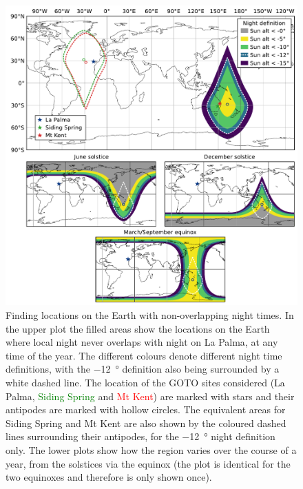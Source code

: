 \begin{colsection}
\begin{figure}[p]
    \begin{center}
        \includegraphics[width=\linewidth]{images/sites.pdf}
    \end{center}
    \caption[Locations on the Earth with non-overlapping night times]{
        Finding locations on the Earth with non-overlapping night times. In the upper plot the filled areas show the locations on the Earth where local night never overlaps with night on La Palma, at any time of the year. The different colours denote different night time definitions, with the \SI{-12}{\degree} definition also being surrounded by a white dashed line. The location of the GOTO sites considered (\textcolor{NavyBlue}{La Palma}, \textcolor{Green}{Siding Spring} and \textcolor{Red}{Mt Kent}) are marked with stars and their antipodes are marked with hollow circles. The equivalent areas for Siding Spring and Mt Kent are also shown by the coloured dashed lines surrounding their antipodes, for the \SI{-12}{\degree} night definition only. The lower plots show how the region varies over the course of a year, from the solstices via the equinox (the plot is identical for the two equinoxes and therefore is only shown once).
    }\label{fig:site_nights}
\end{figure}


\end{colsection}
